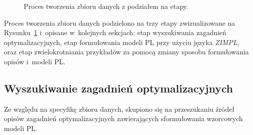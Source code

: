 \begin{figure}
\caption{Proces tworzenia zbioru danych z podziałem na etapy.}
\label{fig:dataset-creation-logical}
\end{figure}

Proces tworzenia zbioru danych podzielono na trzy etapy zwizualizowane na Rysunku~\ref{fig:dataset-creation-logical} i~opisane w~kolejnych sekcjach: etap wyszukiwania zagadnień optymalizacyjnych, etap formułowania modeli PL przy użyciu języka \textit{ZIMPL}, oraz etap zwielokrotniania przykładów za pomocą zmiany sposobu formułowania opisów i~modeli PL. %



\subsection{Wyszukiwanie zagadnień optymalizacyjnych}


Ze względu na specyfikę zbioru danych, skupiono się na przeszukaniu źródeł opisów zagadnień optymalizacyjnych zawierających sformułowania wzorcowych modeli PL.


